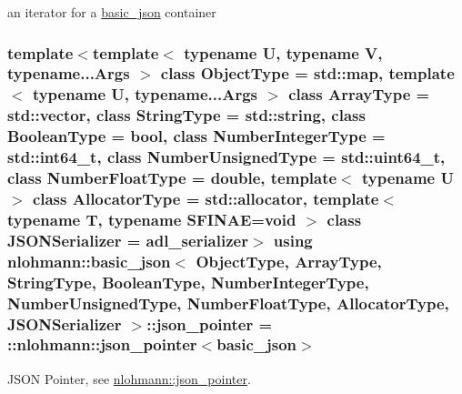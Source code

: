 an iterator for a \hyperlink{classnlohmann_1_1basic__json}{basic\+\_\+json} container 

\subsubsection[{\texorpdfstring{json\+\_\+pointer}{json_pointer}}]{\setlength{\rightskip}{0pt plus 5cm}template$<$template$<$ typename U, typename V, typename...\+Args $>$ class Object\+Type = std\+::map, template$<$ typename U, typename...\+Args $>$ class Array\+Type = std\+::vector, class String\+Type  = std\+::string, class Boolean\+Type  = bool, class Number\+Integer\+Type  = std\+::int64\+\_\+t, class Number\+Unsigned\+Type  = std\+::uint64\+\_\+t, class Number\+Float\+Type  = double, template$<$ typename U $>$ class Allocator\+Type = std\+::allocator, template$<$ typename T, typename S\+F\+I\+N\+A\+E=void $>$ class J\+S\+O\+N\+Serializer = adl\+\_\+serializer$>$ using {\bf nlohmann\+::basic\+\_\+json}$<$ Object\+Type, Array\+Type, String\+Type, Boolean\+Type, Number\+Integer\+Type, Number\+Unsigned\+Type, Number\+Float\+Type, Allocator\+Type, J\+S\+O\+N\+Serializer $>$\+::{\bf json\+\_\+pointer} =  \+::{\bf nlohmann\+::json\+\_\+pointer}$<${\bf basic\+\_\+json}$>$}\hypertarget{classnlohmann_1_1basic__json_a6886a5001f5b449ad316101a311ce536}{}\label{classnlohmann_1_1basic__json_a6886a5001f5b449ad316101a311ce536}


J\+S\+ON Pointer, see \hyperlink{classnlohmann_1_1json__pointer}{nlohmann\+::json\+\_\+pointer}. 

